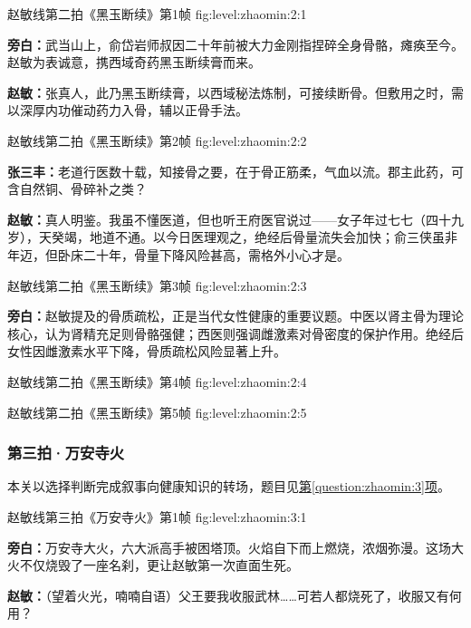   {赵敏线第二拍《黑玉断续》第1帧}
  {fig:level:zhaomin:2:1}
  {\scriptsize}
  {\textbf{旁白：}武当山上，俞岱岩师叔因二十年前被大力金刚指捏碎全身骨骼，瘫痪至今。赵敏为表诚意，携西域奇药黑玉断续膏而来。\par
\textbf{赵敏：}张真人，此乃黑玉断续膏，以西域秘法炼制，可接续断骨。但敷用之时，需以深厚内功催动药力入骨，辅以正骨手法。\par}

\clearpage

  {赵敏线第二拍《黑玉断续》第2帧}
  {fig:level:zhaomin:2:2}
  {\scriptsize}
  {\textbf{张三丰：}老道行医数十载，知接骨之要，在于骨正筋柔，气血以流。郡主此药，可含自然铜、骨碎补之类？\par
\textbf{赵敏：}真人明鉴。我虽不懂医道，但也听王府医官说过——女子年过七七（四十九岁），天癸竭，地道不通。以今日医理观之，绝经后骨量流失会加快；俞三侠虽非年迈，但卧床二十年，骨量下降风险甚高，需格外小心才是。\par}

  {赵敏线第二拍《黑玉断续》第3帧}
  {fig:level:zhaomin:2:3}
  {\scriptsize}
  {\textbf{旁白：}赵敏提及的骨质疏松，正是当代女性健康的重要议题。中医以肾主骨为理论核心，认为肾精充足则骨骼强健；西医则强调雌激素对骨密度的保护作用。绝经后女性因雌激素水平下降，骨质疏松风险显著上升。\par}

  {赵敏线第二拍《黑玉断续》第4帧}
  {fig:level:zhaomin:2:4}
  {\scriptsize}
  {\mbox{}}

\clearpage

  {赵敏线第二拍《黑玉断续》第5帧}
  {fig:level:zhaomin:2:5}
  {\scriptsize}
  {\mbox{}}

\subsubsection{第三拍·万安寺火}\label{plot:zhaomin:3}
本关以选择判断完成叙事向健康知识的转场，题目见\hyperref[question:zhaomin:3]{第\ref*{question:zhaomin:3}项}。

  {赵敏线第三拍《万安寺火》第1帧}
  {fig:level:zhaomin:3:1}
  {\scriptsize}
  {\textbf{旁白：}万安寺大火，六大派高手被困塔顶。火焰自下而上燃烧，浓烟弥漫。这场大火不仅烧毁了一座名刹，更让赵敏第一次直面生死。\par
\textbf{赵敏：}（望着火光，喃喃自语）父王要我收服武林……可若人都烧死了，收服又有何用？\par}

